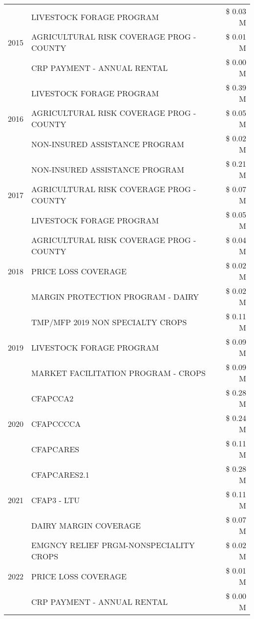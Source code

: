 \begin{tabular}{llr}
\cline{1-3}
\multirow[t]{3}{*}{2015} & LIVESTOCK FORAGE PROGRAM & \$ 0.03 M \\
 & AGRICULTURAL RISK COVERAGE PROG - COUNTY & \$ 0.01 M \\
 & CRP PAYMENT - ANNUAL RENTAL & \$ 0.00 M \\
\cline{1-3}
\multirow[t]{3}{*}{2016} & LIVESTOCK FORAGE PROGRAM & \$ 0.39 M \\
 & AGRICULTURAL RISK COVERAGE PROG - COUNTY & \$ 0.05 M \\
 & NON-INSURED ASSISTANCE PROGRAM & \$ 0.02 M \\
\cline{1-3}
\multirow[t]{3}{*}{2017} & NON-INSURED ASSISTANCE PROGRAM & \$ 0.21 M \\
 & AGRICULTURAL RISK COVERAGE PROG - COUNTY & \$ 0.07 M \\
 & LIVESTOCK FORAGE PROGRAM & \$ 0.05 M \\
\cline{1-3}
\multirow[t]{3}{*}{2018} & AGRICULTURAL RISK COVERAGE PROG - COUNTY & \$ 0.04 M \\
 & PRICE LOSS COVERAGE & \$ 0.02 M \\
 & MARGIN PROTECTION PROGRAM - DAIRY & \$ 0.02 M \\
\cline{1-3}
\multirow[t]{3}{*}{2019} & TMP/MFP 2019 NON SPECIALTY CROPS & \$ 0.11 M \\
 & LIVESTOCK FORAGE PROGRAM & \$ 0.09 M \\
 & MARKET FACILITATION PROGRAM - CROPS & \$ 0.09 M \\
\cline{1-3}
\multirow[t]{3}{*}{2020} & CFAPCCA2 & \$ 0.28 M \\
 & CFAPCCCCA & \$ 0.24 M \\
 & CFAPCARES & \$ 0.11 M \\
\cline{1-3}
\multirow[t]{3}{*}{2021} & CFAPCARES2.1 & \$ 0.28 M \\
 & CFAP3 - LTU & \$ 0.11 M \\
 & DAIRY MARGIN COVERAGE & \$ 0.07 M \\
\cline{1-3}
\multirow[t]{3}{*}{2022} & EMGNCY RELIEF PRGM-NONSPECIALITY CROPS & \$ 0.02 M \\
 & PRICE LOSS COVERAGE & \$ 0.01 M \\
 & CRP PAYMENT - ANNUAL RENTAL & \$ 0.00 M \\
\cline{1-3}
\bottomrule
\end{tabular}
